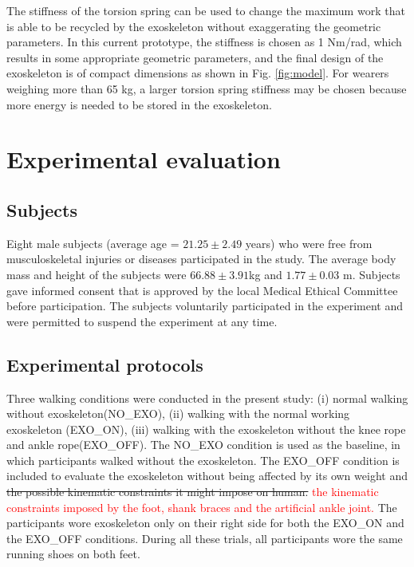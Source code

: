 \documentclass[twocolumn,cleanfoot,10pt]{asme2ej}
\begin{document}

The stiffness of the torsion spring can be used to change the maximum work that is able to be recycled by the exoskeleton without exaggerating the geometric parameters.
In this current prototype, the stiffness is chosen as 1 Nm/rad, which results in some appropriate geometric parameters, and the final design of the exoskeleton is of compact dimensions as shown in Fig. \ref{fig:model}.
For wearers weighing more than 65 kg, a larger torsion spring stiffness may be chosen because more energy is needed to be stored in the exoskeleton.

\section{Experimental evaluation}
\label{sec:experiment}

\subsection{Subjects}
Eight male subjects (average age = $21.25 \pm2.49$  years) who were free from musculoskeletal injuries or diseases participated in the study. The average body mass and height of the subjects were $66.88\pm3.91$kg and $1.77\pm0.03$ m. Subjects gave informed consent that is approved by the local Medical Ethical Committee before participation. The subjects voluntarily participated in the experiment and were permitted to suspend the experiment at any time.   

\subsection{Experimental protocols}
Three walking conditions were conducted in the present study: (i) normal walking without exoskeleton(NO\_EXO), (ii) walking with the normal working exoskeleton (EXO\_ON), (iii) walking with the exoskeleton without the knee rope and ankle rope(EXO\_OFF). The NO\_EXO condition is used as the baseline, in which participants walked without the exoskeleton. The EXO\_OFF condition is included to evaluate the exoskeleton without being affected by its own weight and \sout{the possible kinematic constraints it might impose on human.} \textcolor{red}{the kinematic constraints imposed by the foot, shank braces and the artificial ankle joint.} The participants wore exoskeleton only on their right side for both the EXO\_ON and the EXO\_OFF conditions. During all these trials, all participants wore the same running shoes on both feet. 
\end{document}
